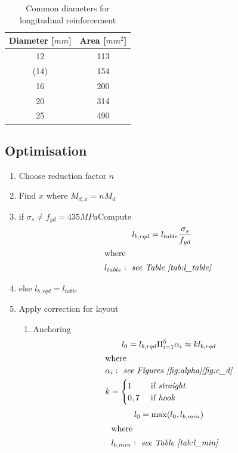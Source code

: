 \documentclass[landscape]{article}
\begin{document}
\begin{multicols*}{2}
\begin{table}[H]
\centering
  \begin{tabular}{cc}
  \toprule
  Diameter [$mm$]& Area [$mm^2$] \\
  \midrule
  12 & 113 \\
  (14) & 154 \\
  16 & 200 \\
  20 & 314 \\
  25 & 490 \\
  \bottomrule
  \end{tabular}
  \caption{Common diameters for longitudinal reinforcement}
  \label{tab:diam_long}
\end{table}

\subsection{Optimisation} %
\begin{enumerate}
  \item Choose reduction factor $n$
  \item Find $x$ where $M_{d,x} = nM_d$
  \item if $\sigma_s\neq f_{yd}=435MPa$Compute 
  \begin{gather}\label{eq:2.1}
      l_{b,rqd} = l_{table} \frac{\sigma_s}{f_{yd}} \\
      \shortintertext{where}
      \begin{aligned}
        &l_{table}: \emph{ see Table~\ref{tab:l_table}} 
      \end{aligned}\notag
    \end{gather}
  \item else $l_{b,rqd} = l_{table}$
  \item Apply correction for layout
  \begin{enumerate}
    \item Anchoring
  \begin{gather}\label{eq:2.1}
      l_0 =  l_{b,rqd}\Pi_{i=1}^5 \alpha_i \approx k l_{b,rqd} \\
      \shortintertext{where}
      \begin{aligned}
        &\alpha_i: \emph{ see Figures~\ref{fig:alpha}\ref{fig:c_d}} \\
        & k = 
        \begin{cases}
          1 &\text{ if } \emph{straight}\\
          0,7 &\text{ if } \emph{hook}
        \end{cases}
      \end{aligned}\notag
    \end{gather}
    \begin{gather}\label{eq:2.1}
      l_0 = \max(l_0,l_{b,min}) \\
      \shortintertext{where}
      \begin{aligned}
        &l_{b,min}: \emph{ see Table~\ref{tab:l_min}} 
      \end{aligned}\notag
    \end{gather}


\end{enumerate}
\end{enumerate}
\end{multicols*}
\end{document}
